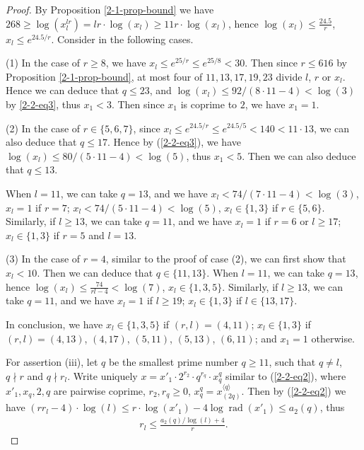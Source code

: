 \documentclass[a4paper, 12pt]{article}
\DeclareMathOperator{\rad}{\text{rad}}
\newcommand{\lagk}[1]{\langle #1 \rangle}
\numberwithin{equation}{section}
\theoremstyle{definition}
\begin{document}
\begin{proof}
By Proposition \ref{2-1-prop-bound} we have 
$268 \ge \log(x_l^{l r}) = lr \cdot \log(x_l) \ge 11 r \cdot \log(x_l)$,
hence $\log(x_l) \le \frac{24.5}{r}$, $x_l \le e^{24.5 / r}$. 
Consider in the following cases.

(1) In the case of $r\ge 8$, we have $x_l \le  e^{25/r} \le e^{25 / 8} < 30$. Then since $r \le 616$ by Proposition \ref{2-1-prop-bound}, at most four of $11,13,17,19,23$ divide $l$, $r$ or $x_l$. Hence we can deduce that $q\le 23$, and $\log(x_l) \le 92 / (8\cdot 11 - 4) < \log(3)$ by \ref{2-2-eq3}, thus $x_1 < 3$. Then since $x_1$ is coprime to $2$, we have $x_1 = 1$.

(2) In the case of $r \in \{5,6,7\}$, since $x_l \le e^{24.5/r} \le e^{24.5 / 5} < 140 < 11\cdot 13$, we can also deduce that $q\le 17$. Hence by (\ref{2-2-eq3}), we have $\log(x_l) \le 80 / (5 \cdot 11 - 4) < \log(5)$, thus $x_1 < 5$.
Then we can also deduce that $q\le 13$.

When $l = 11$, we can take $q = 13$, and we have $x_l < 74 /  (7 \cdot 11 - 4) < \log(3)$, $x_l = 1$ if $r = 7$; $x_l < 74 /  (5 \cdot 11 - 4) < \log(5)$, $x_l\in\{1,3\}$ if $r \in \{5,6\}$. Similarly, if $l \ge 13$, we can take $q = 11$, and we have $x_l=1$ if $r=6$ or $l\ge 17$; $x_l \in \{1,3\}$ if $r=5$ and $l=13$.

(3) In the case of $r=4$, similar to the proof of case (2), we can first show that $x_l < 10$. Then we can deduce that $q \in \{ 11, 13\}$.
When $l = 11$, we can take $q=13$, hence $\log(x_l) \le \frac{74}{rl-4} < \log(7)$, $x_l \in \{1,3,5\}$. Similarly, if $l \ge 13$, we can take $q = 11$, and we have $x_l=1$ if $l\ge 19$; $x_l \in \{1,3\}$ if $l\in \{13,17\}$.

In conclusion, we have $x_l \in \{1,3,5\}$ if $(r,l) = (4,11)$;
$x_l \in \{1,3\}$ if $(r,l) = (4,13)$, $(4,17)$, $(5,11)$, $(5,13)$, $(6,11)$; 
and $x_1 = 1$ otherwise.

For assertion (iii), let $q$ be the smallest prime number $q\ge 11$, such that $q\neq l$, $q\nmid r$ and $q \nmid r_l$. 
Write uniquely $x = x'_1 \cdot 2^{r_2} \cdot q^{r_q} \cdot x_q^{q}$ similar to (\ref{2-2-eq2}), where $x'_1, x_q, 2, q$ are pairwise coprime, $r_2, r_q \ge 0$, $x_q^q = x_{(2q)}^{\lagk{q}}$.
Then by  (\ref{2-2-eq2}) we have $(rr_l -4)\cdot \log(l) \le r\cdot \log(x'_1) - 4\log\rad(x'_1) \le a_2(q)$, thus 
\small\begin{align}  \label{2-2-eq4}
r_l \le \frac{a_2(q)/\log(l)+4}{r} .
\end{align}\normalsize


\end{proof}
\end{document}
